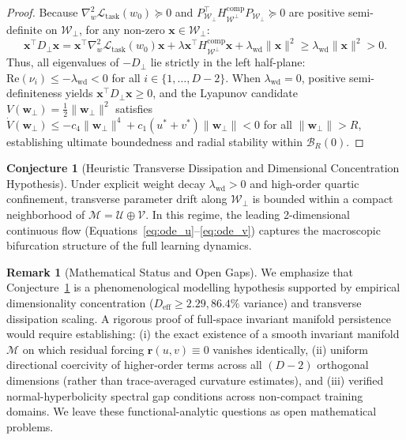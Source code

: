 \documentclass{article}
\theoremstyle{plain}
\theoremstyle{definition}
\newtheorem{conjecture}{Conjecture}
\newtheorem{remark}{Remark}
\begin{document}
\begin{proof}
Because $\nabla_w^2 \mathcal{L}_{\text{task}}(w_0) \succeq 0$ and $P_{\mathcal{W}_\perp}^\top H_{\mathcal{W}^\perp}^{\text{comp}} P_{\mathcal{W}_\perp} \succeq 0$ are positive semi-definite on $\mathcal{W}_\perp$, for any non-zero $\mathbf{x} \in \mathcal{W}_\perp$:
\begin{equation}
    \mathbf{x}^\top D_\perp \mathbf{x} = \mathbf{x}^\top \nabla_w^2 \mathcal{L}_{\text{task}}(w_0) \mathbf{x} + \lambda \mathbf{x}^\top H_{\mathcal{W}^\perp}^{\text{comp}} \mathbf{x} + \lambda_{\text{wd}} \|\mathbf{x}\|^2 \ge \lambda_{\text{wd}} \|\mathbf{x}\|^2 > 0.
\end{equation}
Thus, all eigenvalues of $-D_\perp$ lie strictly in the left half-plane: $\text{Re}(\nu_i) \le -\lambda_{\text{wd}} < 0$ for all $i \in \{1, \dots, D-2\}$. When $\lambda_{\text{wd}} = 0$, positive semi-definiteness yields $\mathbf{x}^\top D_\perp \mathbf{x} \ge 0$, and the Lyapunov candidate $V(\mathbf{w}_\perp) = \frac{1}{2}\|\mathbf{w}_\perp\|^2$ satisfies $\dot{V}(\mathbf{w}_\perp) \le -c_4 \|\mathbf{w}_\perp\|^4 + c_1 (u^* + v^*) \|\mathbf{w}_\perp\| < 0$ for all $\|\mathbf{w}_\perp\| > R$, establishing ultimate boundedness and radial stability within $\mathcal{B}_R(0)$.
\end{proof}

\begin{conjecture}[Heuristic Transverse Dissipation and Dimensional Concentration Hypothesis]
\label{prop:normal_hyperbolicity}
Under explicit weight decay $\lambda_{\text{wd}} > 0$ and high-order quartic confinement, transverse parameter drift along $\mathcal{W}_\perp$ is bounded within a compact neighborhood of $\mathcal{M} = \mathcal{U} \oplus \mathcal{V}$. In this regime, the leading 2-dimensional continuous flow (Equations~\eqref{eq:ode_u}--\eqref{eq:ode_v}) captures the macroscopic bifurcation structure of the full learning dynamics.
\end{conjecture}

\begin{remark}[Mathematical Status and Open Gaps]
We emphasize that Conjecture~\ref{prop:normal_hyperbolicity} is a phenomenological modelling hypothesis supported by empirical dimensionality concentration ($D_{\text{eff}} \ge 2.29, 86.4\%$ variance) and transverse dissipation scaling. A rigorous proof of full-space invariant manifold persistence would require establishing: (i) the exact existence of a smooth invariant manifold $\mathcal{M}$ on which residual forcing $\mathbf{r}(u, v) \equiv 0$ vanishes identically, (ii) uniform directional coercivity of higher-order terms across all $(D-2)$ orthogonal dimensions (rather than trace-averaged curvature estimates), and (iii) verified normal-hyperbolicity spectral gap conditions across non-compact training domains. We leave these functional-analytic questions as open mathematical problems.
\end{remark}
\end{document}
